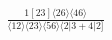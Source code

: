 \documentclass[varwidth, border=5pt]{standalone}
\begin{document}
\begin{my}
$\begin{gathered}
\scriptscriptstyle\frac{1[23]⟨26⟩⟨46⟩}{⟨12⟩⟨23⟩⟨56⟩⟨2|3+4|2]}
\end{gathered}$
\end{my}
\end{document}

